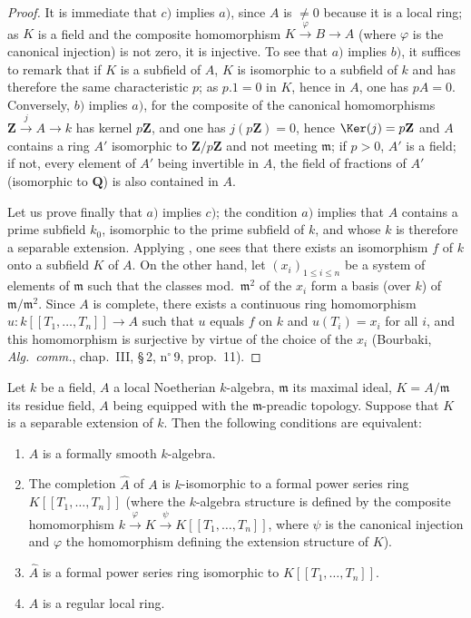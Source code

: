 \begin{proof}
It is immediate that $c)$ implies $a)$, since $A$ is $\neq 0$ because it is a local ring;
as $K$ is a field and the composite homomorphism $K\xrightarrow{\varphi}B\to A$ (where $\varphi$ is the canonical injection) is not zero, it is injective.
To see that $a)$ implies $b)$, it suffices to remark that if $K$ is a subfield of $A$, $K$ is isomorphic to a subfield of $k$ and has therefore the same characteristic $p$;
as $p.1=0$ in $K$, hence in $A$, one has $pA=0$.
Conversely, $b)$ implies $a)$, for the composite of the canonical homomorphisms $\mathbf{Z}\xrightarrow{j}A\to k$ has kernel $p\mathbf{Z}$, and one has $j(p\mathbf{Z})=0$, hence $\Ker(j)=p\mathbf{Z}$ and $A$ contains a ring $A'$
isomorphic to $\mathbf{Z}/p\mathbf{Z}$ and not meeting $\mathfrak{m}$;
if $p>0$, $A'$ is a field; if not, every element of $A'$ being invertible in $A$, the field of fractions of $A'$ (isomorphic to $\mathbf{Q}$) is also contained in $A$.

Let us prove finally that $a)$ implies $c)$;
the condition $a)$ implies that $A$ contains a prime subfield $k_0$, isomorphic to the prime subfield of $k$, and whose $k$ is therefore a separable extension.
Applying , one sees that there exists an isomorphism $f$ of $k$ onto a subfield $K$ of $A$.
On the other hand, let $(x_i)_{1\leq i\leq n}$ be a system of elements of $\mathfrak{m}$ such that the classes mod.\ $\mathfrak{m}^2$ of the $x_i$ form a basis (over $k$) of $\mathfrak{m}/\mathfrak{m}^2$.
Since $A$ is complete, there exists a continuous ring homomorphism $u:k[[T_1,\ldots,T_n]]\to A$ such that $u$ equals $f$ on $k$ and $u(T_i)=x_i$ for all $i$, and this homomorphism is surjective by virtue of the choice of the $x_i$ (Bourbaki, \emph{Alg.\ comm.}, chap.~III, \S\,2, n$^\circ$\,9, prop.~11).
\end{proof}

\begin{theorem}[19.6.4]
\label{0.19.6.4}
Let $k$ be a field, $A$ a local Noetherian $k$-algebra, $\mathfrak{m}$ its maximal ideal, $K=A/\mathfrak{m}$ its residue field, $A$ being equipped with the $\mathfrak{m}$-preadic topology.
Suppose that $K$ is a separable extension of $k$.
Then the following conditions are equivalent:
\begin{enumerate}
  \item[a)] $A$ is a formally smooth $k$-algebra.
  \item[b)] The completion $\widehat{A}$ of $A$ is $k$-isomorphic to a formal power series ring $K[[T_1,\ldots,T_n]]$ (where the $k$-algebra structure is defined by the composite homomorphism $k\xrightarrow{\varphi}K\xrightarrow{\psi}K[[T_1,\ldots,T_n]]$, where $\psi$ is the canonical injection and $\varphi$ the homomorphism defining the extension structure of $K$).
  \item[b')] $\widehat{A}$ is a formal power series ring isomorphic to $K[[T_1,\ldots,T_n]]$.
  \item[c)] $A$ is a regular local ring.
\end{enumerate}
\end{theorem}

